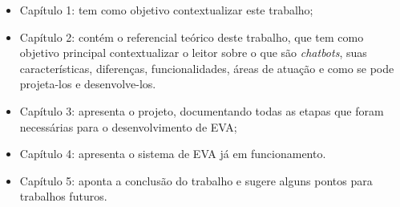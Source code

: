 \begin{itemize}
    \item Capítulo 1: tem como objetivo contextualizar este trabalho; 
    \item Capítulo 2: contém o referencial teórico deste trabalho, que tem como objetivo principal contextualizar o leitor sobre o que são \textit{chatbots}, suas características, diferenças, funcionalidades, áreas de atuação e como se pode projeta-los e desenvolve-los.
    \item Capítulo 3: apresenta o projeto, documentando todas as etapas que foram necessárias para o desenvolvimento de EVA;
    \item Capítulo 4: apresenta o sistema de EVA já em funcionamento.
    \item Capítulo 5: aponta a conclusão do trabalho e sugere alguns pontos para trabalhos futuros.
\end{itemize}
